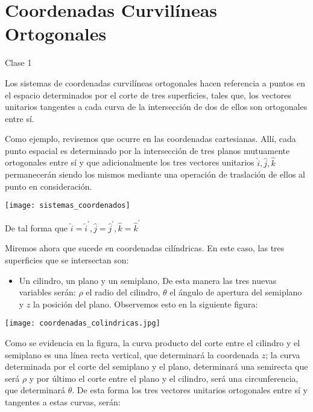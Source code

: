\chapter{Coordenadas Curvilíneas Ortogonales }

Clase 1

Los sistemas de coordenadas curvilíneas ortogonales hacen referencia a puntos en el espacio determinados por el corte de tres superficies, tales que, los vectores unitarios tangentes a cada curva de la intersección de dos de ellos son ortogonales entre sí.

Como ejemplo, revisemos que ocurre en las coordenadas cartesianas. Allí, cada punto espacial es determinado por la intersección de tres planos mutuamente ortogonales entre sí y que adicionalmente los tres vectores unitarios $\hat{i}, \hat{j}, \hat{k}$ permanecerán siendo los mismos mediante una operación de traslación de ellos al punto en consideración.

\begin{center}
  \texttt{[image: sistemas\_coordenados]}
\end{center}

De tal forma que $\hat{i}=\hat{i}^{\prime}, \hat{j}=\hat{j}^{\prime}, \hat{k}=\hat{k}^{\prime}$

Miremos ahora que sucede en coordenadas cilíndricas. En este caso, las tres superficies que se intersectan son:

\begin{itemize}
  \item Un cilindro, un plano y un semiplano, De esta manera las tres nuevas variables serán: $\rho$ el radio del cilindro, $\theta$ el ángulo de apertura del semiplano y $z$ la posición del plano. Observemos esto en la siguiente figura:
\end{itemize}

\begin{center}
\texttt{[image: coordenadas\_colindricas.jpg]}
\end{center}

Como se evidencia en la figura, la curva producto del corte entre el cilindro y el semiplano es una línea recta vertical, que determinará la coordenada $z$; la curva determinada por el corte del semiplano y el plano, determinará una semirecta que será $\rho$ y por último el corte entre el plano y el cilindro, será una circunferencia, que determinará $\theta$. De esta forma los tres vectores unitarios ortogonales entre sí y tangentes a estas curvas, serán:

